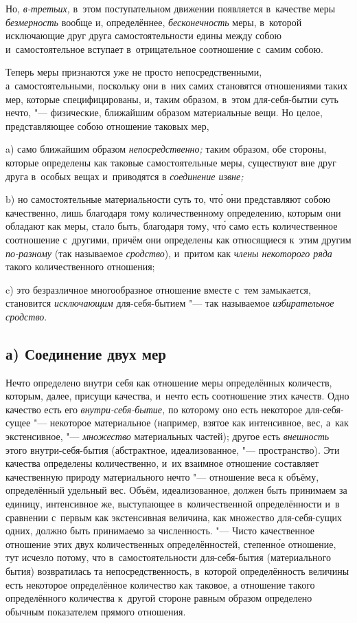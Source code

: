 Но, {\em в-третьих,} в~этом поступательном движении появляется в~качестве меры
{\em безмерность} вообще и, определённее, {\em бесконечность} меры, в~которой
исключающие друг друга самостоятельности едины между собою и~самостоятельное
вступает в~отрицательное соотношение с~самим собою.


Теперь меры признаются уже не просто непосредственными, а~самостоятельными,
поскольку они в~них самих становятся отношениями таких мер, которые
специфицированы, и, таким образом, в~этом для-себя-бытии суть нечто, "---
физические, ближайшим образом материальные вещи. Но целое, представляющее
собою отношение таковых мер,

a) само ближайшим образом {\em непосредственно;} таким образом, обе стороны,
которые определены как таковые самостоятельные меры, существуют вне друг друга
в~особых вещах и~приводятся в {\em соединение извне;}

b) но самостоятельные материальности суть то, чт\'{о} они представляют собою
качественно, лишь благодаря тому количественному определению, которым они
обладают как меры, стало быть, благодаря тому, чт\'{о} само есть количественное
соотношение с~другими, причём они определены как относящиеся к~этим другим
{\em по-разному} (так называемое {\em сродство}), и~притом как
{\em члены некоторого ряда} такого количественного отношения;

c) это безразличное многообразное отношение вместе с~тем замыкается,
становится {\em исключающим} для-себя-бытием "--- так называемое
{\em избирательное сродство}.

\subsection[а) Соединение двух мер]{а) Соединение двух мер}

Нечто определено внутри себя как отношение меры определённых количеств,
которым, далее, присущи качества, и~нечто есть соотношение этих качеств. Одно
качество есть его {\em внутри-себя-бытие,} по которому оно есть некоторое
для-себя-сущее "--- некоторое материальное (например, взятое как интенсивное,
вес, а~как экстенсивное, "--- {\em множество} материальных частей); другое есть
{\em внешность} этого внутри-себя-бытия (абстрактное, идеализованное, "---
пространство). Эти качества определены количественно, и~их взаимное отношение
составляет качественную природу материального нечто "--- отношение веса к
объёму, определённый удельный вес. Объём, идеализованное, должен быть
принимаем за единицу, интенсивное же, выступающее в~количественной
определённости и~в сравнении с~первым как экстенсивная величина, как множество
для-себя-сущих одних, должно быть принимаемо за численность. "--- Чисто
качественное отношение этих двух количественных определённостей, степенн\'{о}е
отношение, тут исчезло потому, что в~самостоятельности для-себя-бытия
(материального бытия) возвратилась та непосредственность, в~которой
определённость величины есть некоторое определённое количество как таковое, а
отношение такого определённого количества к~другой стороне равным образом
определено обычным показателем прямого отношения.


